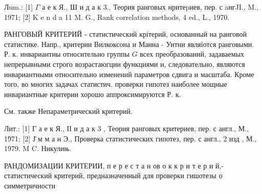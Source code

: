 \documentclass[10pt]{article}
\begin{document}
Лum.: [1] $\Gamma$ а е к Я., Ш и д а к 3., Теория ранговых нритеpиев, пер. с aнгJI., M., 1971; [2] K e n d a 11 M. G., Rank correlation methods, 4 ed., L., 1970.



РАНГОВЫЙ КРИТЕРИЙ - статистический крітерий, основанный на ранговой статистике. Напр., критерии Вилкоксона и Манна - Уитни являіотся ранговыми. Р. к. инвариантны относительно группы $G$ всех преобразований, задаваемых непрерывными строго возрастаюгции функциями и, следовательно, являются инвариантными относительно изменений параметров сдвига и масштаба. Кроме того, во многих задачах статистич. проверки гипотез наиболее мощные инвариантные критерии хорошо аппроксимируются Р. к.



См. также Непараметрический критерий.



Лит.: [1] Г а е к Я., ІІ и д а к 3 , Теория ранговых критериев, пер. с англ., М., 19̀71; [2] Ј̈ м м а н Э., Проверка статистических гипотез, пер. с англ., 2 изд , М., 1979. M C. Никулињ.



РАНДОМИЗАЦИИ КРИТЕРИИ, п е р е с т а н ов о к к р и т е р и й,- статистический критерий, предназначенный для проверки гишотезы о симметричности
\end{document}
